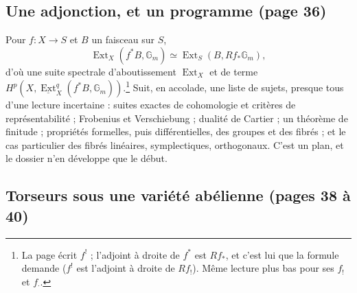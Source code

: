 \documentclass[11pt,a4paper]{article}
\begin{document}
\subsection*{Une adjonction, et un programme (page 36)}

Pour $f\colon X \to S$ et $B$ un faisceau sur $S$,
\[ \operatorname{Ext}_X(f^*B, \mathbb{G}_m) \simeq \operatorname{Ext}_S(B,
Rf_*\mathbb{G}_m) , \]
d'où une suite spectrale d'aboutissement $\operatorname{Ext}_X$ et de terme
$H^p(X, \underline{\operatorname{Ext}}^q_X(f^*B, \mathbb{G}_m))$.\footnote{La page
écrit $f^!$ ; l'adjoint à droite de $f^*$ est $Rf_*$, et c'est lui que la formule
demande ($f^!$ est l'adjoint à droite de $Rf_!$). Même lecture plus bas pour ses
$f_!$ et $f_{\cdot}$.} Suit, en accolade, une liste de sujets, presque tous
d'une lecture incertaine : suites exactes de cohomologie et critères de
représentabilité ; Frobenius et Verschiebung ; dualité de Cartier ; un théorème
de finitude ; propriétés formelles, puis différentielles, des groupes et des
fibrés ; et le cas particulier des fibrés linéaires, symplectiques, orthogonaux.
C'est un plan, et le dossier n'en développe que le début.

\subsection*{Torseurs sous une variété abélienne (pages 38 à 40)}
\end{document}
